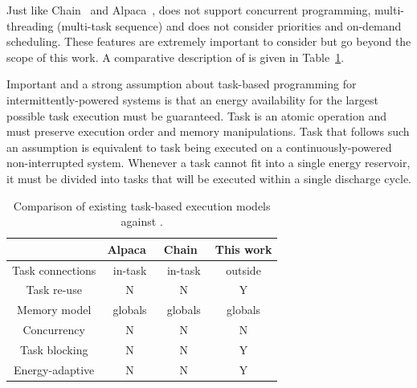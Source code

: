 Just like Chain~\cite{chain} and Alpaca~\cite{alpaca}, \sys does not support concurrent programming, multi-threading (multi-task sequence) and does not consider priorities and on-demand scheduling. These features are extremely important to consider but go beyond the scope of this work. A comparative description of \sys is given in Table~\ref{table:feature_comparison}. 

Important and a strong assumption about task-based programming for intermittently-powered systems is that an energy availability for the largest possible task execution must be guaranteed. Task is an atomic operation and must preserve execution order and memory manipulations. Task that follows such an assumption is equivalent to task being executed on a continuously-powered non-interrupted system. Whenever a task cannot fit into a single energy reservoir, it must be divided into tasks that will be executed within a single discharge cycle.

\begin{table}
	\centering
	\footnotesize
	\begin{tabular}{|c|c|c|c|}
		\hline
		{~} & Alpaca~\cite{alpaca} & Chain~\cite{chain} & This work \\
		\hline\hline
		Task connections & in-task & in-task & outside \\
		Task re-use & N & N & Y\\
		Memory model & globals & globals & globals\\
		Concurrency & N & N & N \\
		Task blocking & N & N & Y \\
		Energy-adaptive & N & N & Y \\
		\hline
	\end{tabular}
	\caption{Comparison of existing task-based execution models against \sys.}
	\label{table:feature_comparison}
\end{table}


%
%

